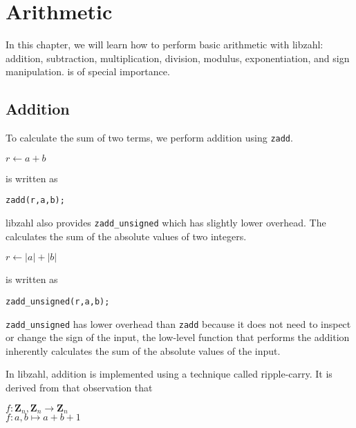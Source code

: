 \chapter{Arithmetic}
\label{chap:Arithmetic}

In this chapter, we will learn how to perform basic
arithmetic with libzahl: addition, subtraction,
multiplication, division, modulus, exponentiation,
and sign manipulation.  is of
special importance.

\vspace{1cm}
\minitoc


\newpage
\section{Addition}
\label{sec:Addition}

To calculate the sum of two terms, we perform
addition using {\tt zadd}.

\vspace{1em}
$r \gets a + b$
\vspace{1em}

\noindent
is written as

\begin{alltt}
   zadd(r, a, b);
\end{alltt}

libzahl also provides {\tt zadd\_unsigned} which
has slightly lower overhead. The calculates the
sum of the absolute values of two integers.

\vspace{1em}
$r \gets \lvert a \rvert + \lvert b \rvert$
\vspace{1em}

\noindent
is written as

\begin{alltt}
   zadd_unsigned(r, a, b);
\end{alltt}

\noindent
{\tt zadd\_unsigned} has lower overhead than
{\tt zadd} because it does not need to inspect
or change the sign of the input, the low-level
function that performs the addition inherently
calculates the sum of the absolute values of
the input.

In libzahl, addition is implemented using a
technique called ripple-carry. It is derived
from that observation that

\vspace{1em}
$f : \textbf{Z}_n, \textbf{Z}_n \rightarrow \textbf{Z}_n$
\\ \indent
$f : a, b \mapsto a + b + 1$
\vspace{1em}

